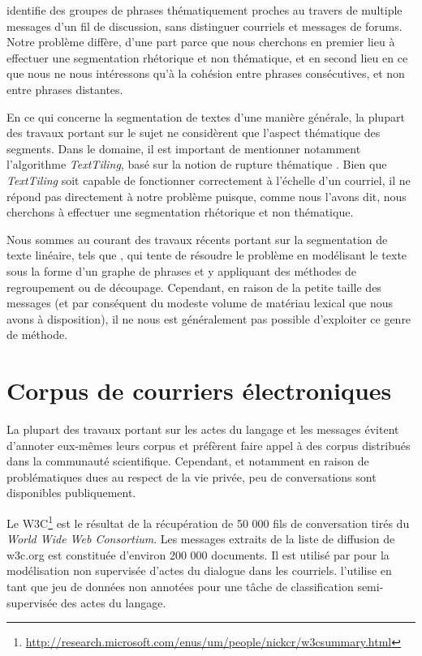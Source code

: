 \cite{joty:2013:jair} identifie des groupes de phrases thématiquement proches au travers de multiple messages d'un fil de discussion, sans distinguer courriels et messages de forums. Notre problème diffère, d'une part parce que nous cherchons en premier lieu à effectuer une segmentation rhétorique et non thématique, et en second lieu en ce que nous ne nous intéressons qu'à la cohésion entre phrases consécutives, et non entre phrases distantes.

En ce qui concerne la segmentation de textes d'une manière générale, la plupart des travaux portant sur le sujet ne considèrent que l'aspect thématique des segments. Dans le domaine, il est important de mentionner notamment l'algorithme \textit{TextTiling}, basé sur la notion de rupture thématique \cite{hearst1997texttiling}. Bien que \textit{TextTiling} soit capable de fonctionner correctement à l'échelle d'un courriel, il ne répond pas directement à notre problème puisque, comme nous l'avons dit, nous cherchons à effectuer une segmentation rhétorique et non thématique.

Nous sommes au courant des travaux récents portant sur la segmentation de texte linéaire, tels que \cite{kazantseva:2011}, qui tente de résoudre le problème en modélisant le texte sous la forme d'un graphe de phrases et y appliquant des méthodes de regroupement ou de découpage. Cependant, en raison de la petite taille des messages (et par conséquent du modeste volume de matériau lexical que nous avons à disposition), il ne nous est généralement pas possible d'exploiter ce genre de méthode.

\section{Corpus de courriers électroniques}

La plupart des travaux portant sur les actes du langage et les messages évitent d'annoter eux-mêmes leurs corpus et préfèrent faire appel à des corpus distribués dans la communauté scientifique. Cependant, et notamment en raison de problématiques dues au respect de la vie privée, peu de conversations sont disponibles publiquement.

Le W3C\footnote{\url{http://research.microsoft.com/enus/um/people/nickcr/w3csummary.html}} est le résultat de la récupération de 50 000 fils de conversation tirés du \textit{World Wide Web Consortium}. Les messages extraits de la liste de diffusion de w3c.org est constituée d'environ 200 000 documents. Il est utilisé par \cite{joty:2011:ijcai} pour la modélisation non supervisée d'actes du dialogue dans les courriels. \cite{joty:2013:sigdial} l'utilise en tant que jeu de données non annotées pour une tâche de classification semi-supervisée des actes du langage.

